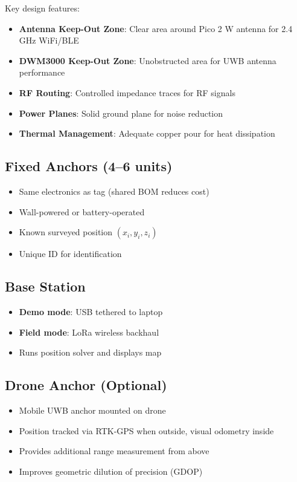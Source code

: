 \documentclass[11pt,a4paper]{article}
\begin{document}
Key design features:
\begin{itemize}
    \item \textbf{Antenna Keep-Out Zone}: Clear area around Pico 2 W antenna for 2.4 GHz WiFi/BLE
    \item \textbf{DWM3000 Keep-Out Zone}: Unobstructed area for UWB antenna performance
    \item \textbf{RF Routing}: Controlled impedance traces for RF signals
    \item \textbf{Power Planes}: Solid ground plane for noise reduction
    \item \textbf{Thermal Management}: Adequate copper pour for heat dissipation
\end{itemize}

\subsection{Fixed Anchors (4--6 units)}

\begin{itemize}
    \item Same electronics as tag (shared BOM reduces cost)
    \item Wall-powered or battery-operated
    \item Known surveyed position $(x_i, y_i, z_i)$
    \item Unique ID for identification
\end{itemize}

\subsection{Base Station}

\begin{itemize}
    \item \textbf{Demo mode}: USB tethered to laptop
    \item \textbf{Field mode}: LoRa wireless backhaul
    \item Runs position solver and displays map
\end{itemize}

\subsection{Drone Anchor (Optional)}

\begin{itemize}
    \item Mobile UWB anchor mounted on drone
    \item Position tracked via RTK-GPS when outside, visual odometry inside
    \item Provides additional range measurement from above
    \item Improves geometric dilution of precision (GDOP)
\end{itemize}
\end{document}
